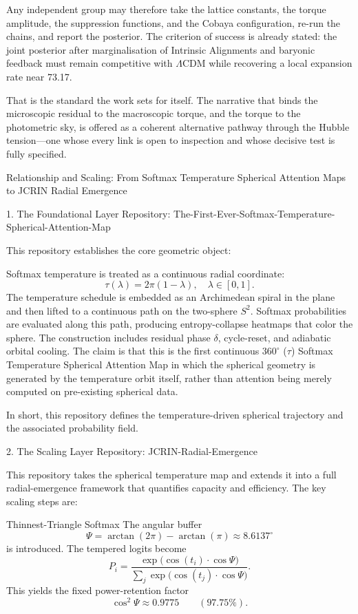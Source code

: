 Any independent group may therefore take the lattice constants, the torque amplitude, the suppression functions, and the Cobaya configuration, re-run the chains, and report the posterior. The criterion of success is already stated: the joint posterior after marginalisation of Intrinsic Alignments and baryonic feedback must remain competitive with \(\Lambda\)CDM while recovering a local expansion rate near 73.17.  

That is the standard the work sets for itself. The narrative that binds the microscopic residual to the macroscopic torque, and the torque to the photometric sky, is offered as a coherent alternative pathway through the Hubble tension—one whose every link is open to inspection and whose decisive test is fully specified.

Relationship and Scaling: From Softmax Temperature Spherical Attention Maps to JCRIN Radial Emergence

1. The Foundational Layer  
Repository: The-First-Ever-Softmax-Temperature-Spherical-Attention-Map

This repository establishes the core geometric object:

Softmax temperature is treated as a continuous radial coordinate:  
  \[
  \tau(\lambda) = 2\pi(1-\lambda), \quad \lambda\in[0,1].
  \]
The temperature schedule is embedded as an Archimedean spiral in the plane and then lifted to a continuous path on the two-sphere \(S^2\).
Softmax probabilities are evaluated along this path, producing entropy-collapse heatmaps that color the sphere.
The construction includes residual phase \(\delta\), cycle-reset, and adiabatic orbital cooling.
The claim is that this is the first continuous \(360^\circ\) (\(\tau\)) Softmax Temperature Spherical Attention Map in which the spherical geometry is generated by the temperature orbit itself, rather than attention being merely computed on pre-existing spherical data.

In short, this repository defines the temperature-driven spherical trajectory and the associated probability field.

2. The Scaling Layer  
Repository: JCRIN-Radial-Emergence

This repository takes the spherical temperature map and extends it into a full radial-emergence framework that quantifies capacity and efficiency. The key scaling steps are:

Thinnest-Triangle Softmax  
   The angular buffer  
   \[
   \Psi = \arctan(2\pi)-\arctan(\pi)\approx 8.6137^\circ
   \]
   is introduced. The tempered logits become  
   \[
   P_i = \frac{\exp\bigl(\cos(t_i)\cdot\cos\Psi\bigr)}{\sum_j\exp\bigl(\cos(t_j)\cdot\cos\Psi\bigr)}.
   \]
   This yields the fixed power-retention factor  
   \[
   \cos^2\Psi\approx 0.9775\qquad(97.75\%).
   \]

